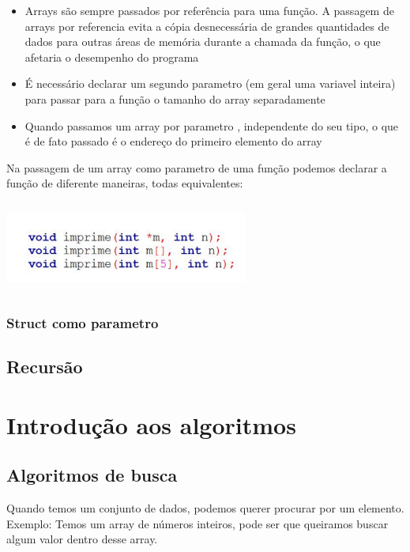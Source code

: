 \documentclass{report}
\begin{document}
	\begin{itemize}
		\item Arrays são sempre passados por referência para uma função. A passagem de arrays por referencia evita a cópia desnecessária de grandes quantidades de dados para outras áreas de memória durante a chamada da função, o que afetaria o desempenho do programa
		\item É necessário declarar um segundo parametro (em geral uma variavel inteira) para passar para a função o tamanho do array separadamente 
		\item Quando passamos um array por parametro , independente do seu tipo, o que é de fato passado é o endereço do primeiro elemento do array
	\end{itemize}
	
	Na passagem de um array como parametro de uma função podemos declarar a função de diferente maneiras, todas equivalentes:
	
	\begin{center}
		
		\includegraphics[width=8cm,height=3cm,keepaspectratio=false]{imagens/funcarray.png}
		
	\end{center}
	
	
	
	\subsection{Struct como parametro}
	
	\section{Recursão}
	
	\chapter{Introdução aos algoritmos}
	\section{Algoritmos de busca}
	Quando temos um conjunto de dados, podemos querer procurar por um elemento. Exemplo: Temos um array de números inteiros, pode ser que queiramos buscar algum valor dentro desse array.
	
\end{document}
